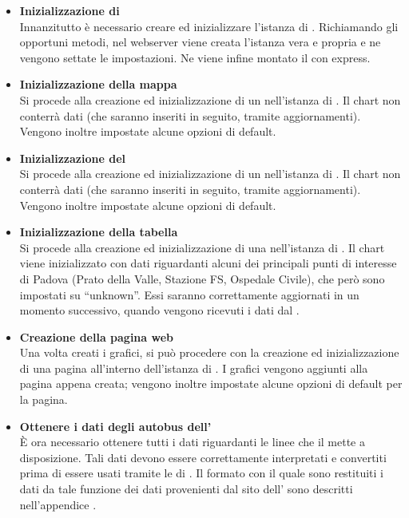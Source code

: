         \begin{itemize}

            \item \textbf{Inizializzazione di } \\
            Innanzitutto è necessario creare ed inizializzare l'istanza di . Richiamando gli opportuni metodi, nel webserver viene creata l'istanza vera e propria e ne vengono settate le impostazioni. Ne viene infine montato il  con express.
            
            \item \textbf{Inizializzazione della mappa} \\
            Si procede alla creazione ed inizializzazione di un  nell'istanza di . Il chart non conterrà dati (che saranno inseriti in seguito, tramite aggiornamenti). Vengono inoltre impostate alcune opzioni di default. 
            
            \item \textbf{Inizializzazione del } \\
            Si procede alla creazione ed inizializzazione di un  nell'istanza di . Il chart non conterrà dati (che saranno inseriti in seguito, tramite aggiornamenti). Vengono inoltre impostate alcune opzioni di default.
                        
            \item \textbf{Inizializzazione della tabella} \\
            Si procede alla creazione ed inizializzazione di una  nell'istanza di . Il chart viene inizializzato con dati riguardanti alcuni dei principali punti di interesse di Padova (Prato della Valle, Stazione FS, Ospedale Civile), che però sono impostati su “unknown”. Essi saranno correttamente aggiornati in un momento successivo, quando vengono ricevuti i dati dal  .
            
            \item \textbf{Creazione della pagina web} \\
            Una volta creati i grafici, si può procedere con la creazione ed inizializzazione di una pagina all'interno dell'istanza di . I grafici vengono aggiunti alla pagina appena creata; vengono inoltre impostate alcune opzioni di default per la pagina.
            
            \item \textbf{Ottenere i dati degli autobus dell'} \\
            È ora necessario ottenere tutti i dati riguardanti le linee che il   mette a disposizione. Tali dati devono essere correttamente interpretati e convertiti prima di essere usati tramite le  di . Il formato con il quale sono restituiti i dati da tale funzione dei dati provenienti dal sito dell' sono descritti nell'appendice .
            

\end{itemize}
